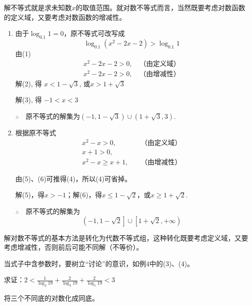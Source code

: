 \begin{analyze}
    解不等式就是求未知数$x$的取值范围。就对数不等式而言，当然既要考虑对数函数的定义域，又要考虑对数函数的增减性。
\end{analyze}

\begin{solution}
\begin{enumerate}[(1)]
    \item 由于$\log_{0.1}1=0$，原不等式可改写成
\begin{equation}
    \log_{0.1}(x^2-2x-2)>\log_{0.1}1   \tag{1}
\end{equation}
由(1)
\begin{align}
    x^2-2x-2>0, \quad \text{（由定义域）} \tag{2}\\
    x^2-2x-2>0, \quad \text{（由增减性）} \tag{3}
\end{align}
解(2), 得 $x<1-\sqrt{3}$, 或$x>1+\sqrt{3}$

解(3), 得 $-1<x<3$

$\therefore\quad $原不等式的解集为$(-1,1-\sqrt{3})\cup (1+\sqrt{3},3)$.

\item 根据原不等式
\begin{align}
    x^2-x>0,&\quad \text{（由定义域）} \tag{4}\\
    x+1>0,&\tag{5}\\
    x^2-x\ge x+1,&\quad \text{（由增减性）} \tag{6}
\end{align}

由(5)、(6)可推得(4)，所以(4)可省掉。

解(5)，得$x>-1$；解(6)，得$x\le 1-\sqrt{2}$，或$x\ge 1+\sqrt{2}$.

$\therefore\quad $原不等式的解集为
\[\left(-1,1-\sqrt{2}\right]\cup \left[1+\sqrt{2},+\infty\right)\]
\end{enumerate}
\end{solution}

\begin{note}
    解对数不等式的基本方法是转化为代数不等式组，这种转化既要考虑定义域，又要考虑增减性，否则前后可能不同解（不等价）。

    当式子中含参数时，要树立“讨论”的意识，如例4中的(3)、(4)。
\end{note}

\begin{example}
求证：$2<\frac{1}{\log_2 19}+\frac{2}{\log_3 19}+\frac{2}{\log_5 19}<3$
\end{example}

\begin{analyze}
    将三个不同底的对数化成同底。
\end{analyze}

